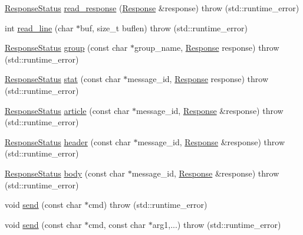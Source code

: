 \begin{DoxyCompactItemize}
\item 
\hyperlink{namespace_nntp_client_a920c73a4038b2a2c307245b909b43203}{Response\+Status} \hyperlink{class_nntp_client_1_1_connection_a7eb4da715f24ad554dac36642f46850a}{read\+\_\+response} (\hyperlink{class_nntp_client_1_1_response}{Response} \&response)  throw (std\+::runtime\+\_\+error)
\item 
int \hyperlink{class_nntp_client_1_1_connection_a4be644ac15bed1aac402e7562a6c2f3e}{read\+\_\+line} (char $\ast$buf, size\+\_\+t buflen)  throw (std\+::runtime\+\_\+error)
\item 
\hyperlink{namespace_nntp_client_a920c73a4038b2a2c307245b909b43203}{Response\+Status} \hyperlink{class_nntp_client_1_1_connection_a198e438060db29f7d6c990849d887d89}{group} (const char $\ast$group\+\_\+name, \hyperlink{class_nntp_client_1_1_response}{Response} response)  throw (std\+::runtime\+\_\+error)
\item 
\hyperlink{namespace_nntp_client_a920c73a4038b2a2c307245b909b43203}{Response\+Status} \hyperlink{class_nntp_client_1_1_connection_a059b80b6d2986a76704792cccf1e2f9a}{stat} (const char $\ast$message\+\_\+id, \hyperlink{class_nntp_client_1_1_response}{Response} response)  throw (std\+::runtime\+\_\+error)
\item 
\hyperlink{namespace_nntp_client_a920c73a4038b2a2c307245b909b43203}{Response\+Status} \hyperlink{class_nntp_client_1_1_connection_a778194b662ca3954ef00122a8f7beb82}{article} (const char $\ast$message\+\_\+id, \hyperlink{class_nntp_client_1_1_response}{Response} \&response)  throw (std\+::runtime\+\_\+error)
\item 
\hyperlink{namespace_nntp_client_a920c73a4038b2a2c307245b909b43203}{Response\+Status} \hyperlink{class_nntp_client_1_1_connection_ad9a97c7814f2a0584cb45447a2ca5472}{header} (const char $\ast$message\+\_\+id, \hyperlink{class_nntp_client_1_1_response}{Response} \&response)  throw (std\+::runtime\+\_\+error)
\item 
\hyperlink{namespace_nntp_client_a920c73a4038b2a2c307245b909b43203}{Response\+Status} \hyperlink{class_nntp_client_1_1_connection_a1665cd7d2bdb1960222f2935ecf26e8f}{body} (const char $\ast$message\+\_\+id, \hyperlink{class_nntp_client_1_1_response}{Response} \&response)  throw (std\+::runtime\+\_\+error)
\item 
void \hyperlink{class_nntp_client_1_1_connection_a49adc2c2fc472d6066dbd4282a28ba6a}{send} (const char $\ast$cmd)  throw (std\+::runtime\+\_\+error)
\item 
void \hyperlink{class_nntp_client_1_1_connection_a3a3e41cb99fd302d63f3d5cdb5f793f5}{send} (const char $\ast$cmd, const char $\ast$arg1,...)  throw (std\+::runtime\+\_\+error)

\end{DoxyCompactItemize}
